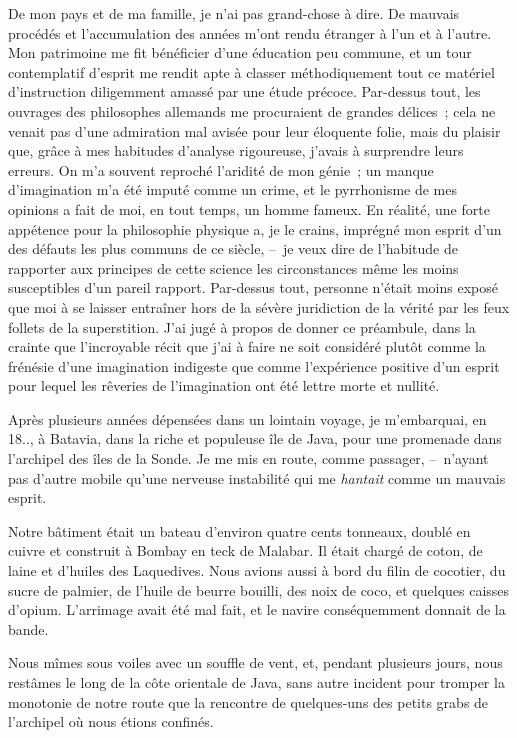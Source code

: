 \documentclass[french,twoside]{book} %
\newcommand{\bibl}[1]{{\RaggedLeft{#1}\par\bigskip}}
\begin{document}
\bibl{{\scshape Quinault}. – \emph{Atys.}}
\noindent De mon pays et de ma famille, je n’ai pas grand-chose à dire. De mauvais procédés et l’accumulation des années m’ont rendu étranger à l’un et à l’autre. Mon patrimoine me fit bénéficier d’une éducation peu commune, et un tour contemplatif d’esprit me rendit apte à classer méthodiquement tout ce matériel d’instruction diligemment amassé par une étude précoce. Par-dessus tout, les ouvrages des philosophes allemands me procuraient de grandes délices ; cela ne venait pas d’une admiration mal avisée pour leur éloquente folie, mais du plaisir que, grâce à mes habitudes d’analyse rigoureuse, j’avais à surprendre leurs erreurs. On m’a souvent reproché l’aridité de mon génie ; un manque d’imagination m’a été imputé comme un crime, et le pyrrhonisme de mes opinions a fait de moi, en tout temps, un homme fameux. En réalité, une forte appétence pour la philosophie physique a, je le crains, imprégné mon esprit d’un des défauts les plus communs de ce siècle, – je veux dire de l’habitude de rapporter aux principes de cette science les circonstances même les moins susceptibles d’un pareil rapport. Par-dessus tout, personne n’était moins exposé que moi à se laisser entraîner hors de la sévère juridiction de la vérité par les feux follets de la superstition. J’ai jugé à propos de donner ce préambule, dans la crainte que l’incroyable récit que j’ai à faire ne soit considéré plutôt comme la frénésie d’une imagination indigeste que comme l’expérience positive d’un esprit pour lequel les rêveries de l’imagination ont été lettre morte et nullité.\par
Après plusieurs années dépensées dans un lointain voyage, je m’embarquai, en 18.., à Batavia, dans la riche et populeuse île de Java, pour une promenade dans l’archipel des îles de la Sonde. Je me mis en route, comme passager, – n’ayant pas d’autre mobile qu’une nerveuse instabilité qui me \emph{hantait} comme un mauvais esprit.\par
Notre bâtiment était un bateau d’environ quatre cents tonneaux, doublé en cuivre et construit à Bombay en teck de Malabar. Il était chargé de coton, de laine et d’huiles des Laquedives. Nous avions aussi à bord du filin de cocotier, du sucre de palmier, de l’huile de beurre bouilli, des noix de coco, et quelques caisses d’opium. L’arrimage avait été mal fait, et le navire conséquemment donnait de la bande.\par
Nous mîmes sous voiles avec un souffle de vent, et, pendant plusieurs jours, nous restâmes le long de la côte orientale de Java, sans autre incident pour tromper la monotonie de notre route que la rencontre de quelques-uns des petits grabs de l’archipel où nous étions confinés.\par
\end{document}
